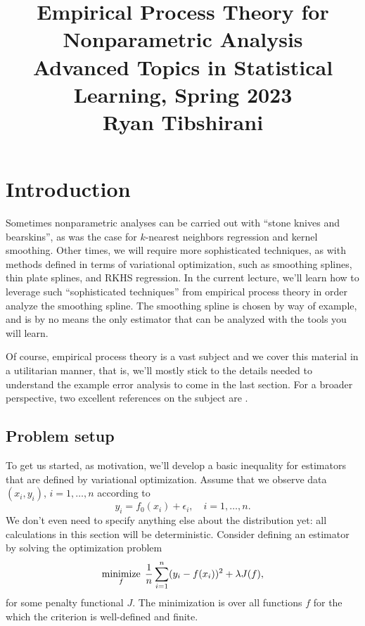 \documentclass{article}
\title{Empirical Process Theory for Nonparametric Analysis \\ \smallskip
\large Advanced Topics in Statistical Learning, Spring 2023 \\ \smallskip
Ryan Tibshirani}
\author{}
\date{}
\begin{document}
\maketitle
\RaggedRight
\vspace{-50pt}

\section{Introduction}

Sometimes nonparametric analyses can be carried out with ``stone knives and 
bearskins'', as was the case for $k$-nearest neighbors regression and kernel 
smoothing. Other times, we will require more sophisticated techniques, as with
methods defined in terms of variational optimization, such as smoothing splines,
thin plate splines, and RKHS regression. In the current lecture, we'll learn how
to leverage such ``sophisticated techniques'' from empirical process theory in
order analyze the smoothing spline. The smoothing spline is chosen by way of
example, and is by no means the only estimator that can be analyzed with the
tools you will learn. 

Of course, empirical process theory is a vast subject and we cover this material
in a utilitarian manner, that is, we'll mostly stick to the details needed to
understand the example error analysis to come in the last section. For a broader
perspective, two excellent references on the subject are
\citet{vandegeer2000empirical, wainwright2019high}.         

\subsection{Problem setup}

\def\TV{\mathrm{TV}}

To get us started, as motivation, we'll develop a basic inequality for
estimators that are defined by variational optimization. Assume that we observe
data $(x_i,y_i)$, $i=1,\dots,n$ according to
\begin{equation}
\label{eq:model}
y_i = f_0(x_i) + \epsilon_i, \quad i=1,\dots,n.
\end{equation}
We don't even need to specify anything else about the distribution yet: all 
calculations in this section will be deterministic. Consider defining an
estimator by solving the optimization problem 
\begin{equation}
\label{eq:variational_opt}
\mathop{\mathrm{minimize}}_f \; \frac{1}{n} \sum_{i=1}^n (y_i - f(x_i))^2 + \lambda J(f), 
\end{equation}
for some penalty functional $J$. The minimization is over all functions $f$ for
the which the criterion is well-defined and finite. 
\end{document}
